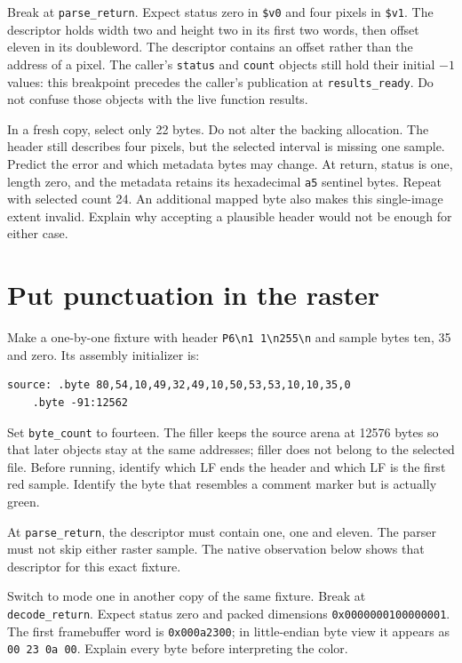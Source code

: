 Break at \texttt{parse\_return}. Expect status zero in \texttt{\$v0} and
four pixels in \texttt{\$v1}. The descriptor holds width two and height two
in its first two words, then offset eleven in its doubleword. The descriptor
contains an offset rather than the address of a pixel. The caller's
\texttt{status} and \texttt{count} objects still hold their initial $-1$ values:
this breakpoint precedes the caller's publication at \texttt{results\_ready}.
Do not confuse those objects with the live function results.

In a fresh copy, select only 22 bytes. Do not alter the backing allocation.
The header still describes four pixels, but the selected interval is missing
one sample. Predict the error and which metadata bytes may change. At return,
status is one, length zero, and the metadata retains its hexadecimal
\texttt{a5} sentinel bytes. Repeat with selected count 24. An additional mapped
byte also makes this single-image extent invalid. Explain why accepting a
plausible header would not be enough for either case.

\section{Put punctuation in the raster}

Make a one-by-one fixture with header \texttt{P6\textbackslash n1 1\textbackslash n255\textbackslash n}
and sample bytes ten, 35 and zero. Its assembly initializer is:
\begin{verbatim}
source: .byte 80,54,10,49,32,49,10,50,53,53,10,10,35,0
    .byte -91:12562
\end{verbatim}
Set \texttt{byte\_count} to fourteen. The filler keeps the source arena at
12576 bytes so that later objects stay at the same addresses; filler does not
belong to the selected file. Before running, identify which LF ends the header
and which LF is the first red sample. Identify the byte that resembles a
comment marker but is actually green.

At \texttt{parse\_return}, the descriptor must contain one, one and eleven.
The parser must not skip either raster sample. The native observation below
shows that descriptor for this exact fixture.



Switch to mode one in another copy of the same fixture. Break at
\texttt{decode\_return}. Expect status zero and packed dimensions
\texttt{0x0000000100000001}. The first framebuffer word is
\texttt{0x000a2300}; in little-endian byte view it appears as
\texttt{00 23 0a 00}. Explain every byte before interpreting the color.


